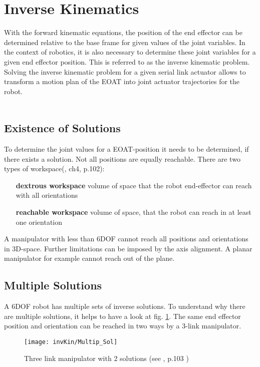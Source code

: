 \section{Inverse Kinematics}

With the forward kinematic equations, the position of the end effector can be determined relative to the base frame for given values of the joint variables.
In the context of robotics, it is also necessary to determine these joint variables for a given end effector position.
This is referred to as the inverse kinematic problem.
Solving the inverse kinematic problem for a given serial link actuator allows to transform a motion plan of the \ac{EOAT} into joint actuator trajectories for the robot.\\
\\
\subsection{Existence of Solutions} \label{ExistSol}
To determine the joint values for a \ac{EOAT}-position it needs to be determined, if there exists a solution.
Not all positions are equally reachable.
There are two types of workspace(\cite{craig1986introduction}, ch4, p.102):
\begin{itemize}[wide=\parindent] 
	\item[\textbf{dextrous workspace}] volume of space that the robot end-effector can reach with all orientations
	\item[\textbf{reachable workspace}] volume of space, that the robot can reach in at least one orientation
\end{itemize}


A manipulator with less than 6\ac{DOF} cannot reach all positions and orientations in 3D-space. Further limitations can be imposed by the axis alignment. A planar manipulator for example cannot reach  out of the plane. \cite{craig1986introduction}

\subsection{Multiple Solutions} \label{MultipSol}
A 6\ac{DOF} robot has multiple sets of inverse solutions. To understand why there are multiple solutions, it helps to have a look at fig. \ref{fig:multipSol3Link}. The same end effector position and orientation can be reached in two ways by a 3-link manipulator. 

\begin{figure}[H]
	\texttt{[image: invKin/Multip\_Sol]}
	\caption{Three link manipulator with 2 solutions (see \cite{craig1986introduction}, p.103 )}
	\label{fig:multipSol3Link}
\end{figure}

